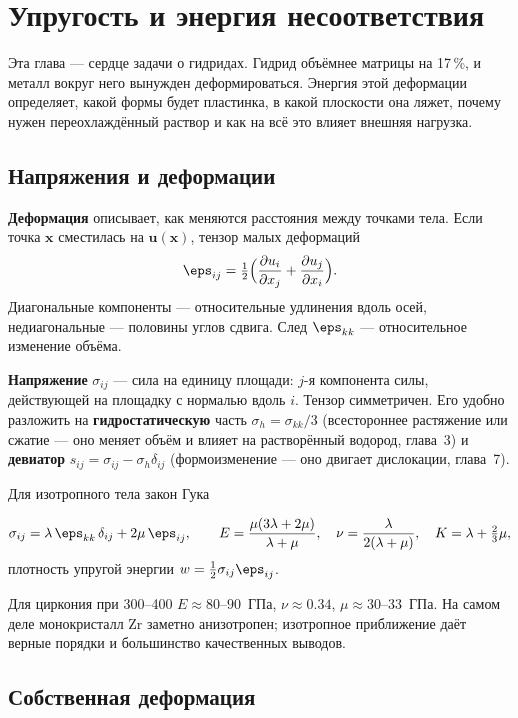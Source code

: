\chapter{Упругость и энергия несоответствия}

Эта глава --- сердце задачи о гидридах. Гидрид объёмнее матрицы на 17\,\%, и металл вокруг него вынужден
деформироваться. Энергия этой деформации определяет, какой формы будет пластинка, в какой плоскости она ляжет,
почему нужен переохлаждённый раствор и как на всё это влияет внешняя нагрузка.

\section{Напряжения и деформации}

\textbf{Деформация} описывает, как меняются расстояния между точками тела. Если точка $\mathbf x$ сместилась на
$\mathbf u(\mathbf x)$, тензор малых деформаций
\begin{equation}
\eps_{ij} = \tfrac12\Bigl(\frac{\partial u_i}{\partial x_j} + \frac{\partial u_j}{\partial x_i}\Bigr).
\end{equation}
Диагональные компоненты --- относительные удлинения вдоль осей, недиагональные --- половины углов сдвига.
След $\eps_{kk}$ --- относительное изменение объёма.

\textbf{Напряжение} $\sigma_{ij}$ --- сила на единицу площади: $j$-я компонента силы, действующей на площадку с
нормалью вдоль $i$. Тензор симметричен. Его удобно разложить на \textbf{гидростатическую} часть
$\sigma_h = \sigma_{kk}/3$ (всестороннее растяжение или сжатие --- оно меняет объём и влияет на растворённый
водород, глава~3) и \textbf{девиатор} $s_{ij} = \sigma_{ij} - \sigma_h\delta_{ij}$ (формоизменение --- оно
двигает дислокации, глава~7).

Для изотропного тела закон Гука
\begin{keyf}
\[
\sigma_{ij} = \lambda\,\eps_{kk}\,\delta_{ij} + 2\mu\,\eps_{ij},\qquad
E = \frac{\mu(3\lambda+2\mu)}{\lambda+\mu},\quad \nu = \frac{\lambda}{2(\lambda+\mu)},\quad K = \lambda + \tfrac23\mu ,
\]
плотность упругой энергии $w = \tfrac12\sigma_{ij}\eps_{ij}$.
\end{keyf}
Для циркония при 300--400\degC{} $E\approx 80$--$90$~ГПа, $\nu\approx0.34$, $\mu\approx30$--$33$~ГПа. На самом деле
монокристалл Zr заметно анизотропен; изотропное приближение даёт верные порядки и большинство качественных
выводов.

\section{Собственная деформация}

